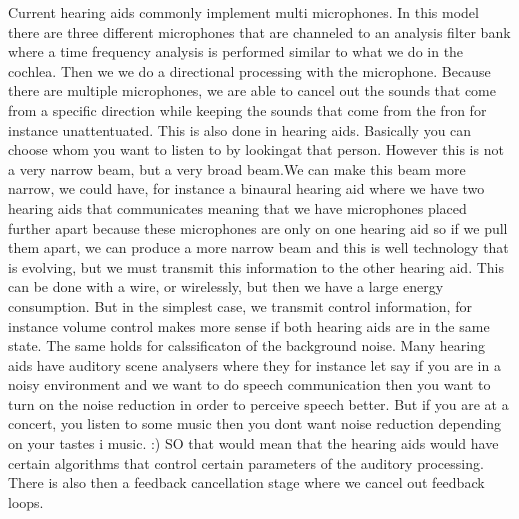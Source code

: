 Current hearing aids commonly implement multi microphones. In this model there are three different microphones that are channeled to an analysis filter bank where a time frequency analysis is performed similar to what we do in the cochlea. Then we we do a directional processing with the microphone. Because there are multiple microphones, we are able to cancel out the sounds that come from a specific direction while keeping the sounds that come from the fron for instance unattentuated. This is also done in hearing aids. Basically you can choose whom you want to listen to by lookingat that person. However this is not a very narrow beam, but a very broad beam.We can make this beam more narrow, we could have, for instance a binaural hearing aid where we have two hearing aids that communicates meaning that we have microphones placed further apart because these microphones are only on one hearing aid so if we pull them apart, we can produce a more narrow beam and this is  well technology that is evolving, but we must transmit this information to the other hearing aid.  This can be done with a wire, or wirelessly, but then we have a large energy consumption.  But in the simplest case, we transmit control information, for instance volume control makes more sense if both hearing aids are in the same state. The same holds for calssificaton of the background noise.  Many hearing aids have auditory scene analysers where they for instance let say if you are in a noisy environment and we want to do speech communication then you want to turn on the noise reduction in order to perceive speech better.  But if you are at a concert, you listen to some music then you dont want noise reduction depending on your tastes i music. :) SO that would mean that the hearing aids would have certain algorithms that control certain parameters of the auditory processing. There is also then a feedback cancellation stage where we cancel out feedback loops. 